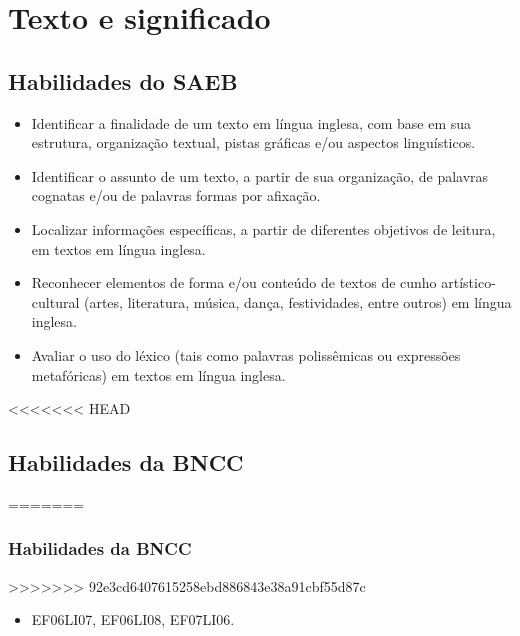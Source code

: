 \chapter{Texto e significado}

\section{Habilidades do SAEB}

\begin{itemize}
\item Identificar a finalidade de um texto em língua inglesa, com base em
sua estrutura, organização textual, pistas gráficas e/ou aspectos
linguísticos.

\item Identificar o assunto de um texto, a partir de sua organização, de
palavras cognatas e/ou de palavras formas por afixação.

\item Localizar informações específicas, a partir de diferentes objetivos de
leitura, em textos em língua inglesa.

\item Reconhecer elementos de forma e/ou conteúdo de textos de cunho
artístico-cultural (artes, literatura, música, dança, festividades,
entre outros) em língua inglesa.

\item Avaliar o uso do léxico (tais como palavras polissêmicas ou expressões
metafóricas) em textos em língua inglesa.
\end{itemize}

<<<<<<< HEAD
\section{Habilidades da BNCC}
=======
\subsection{Habilidades da BNCC}
>>>>>>> 92e3cd6407615258ebd886843e38a91cbf55d87c

\begin{itemize}
\item EF06LI07, EF06LI08, EF07LI06.
\end{itemize}

